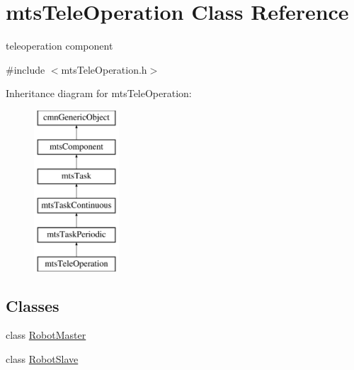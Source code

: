 \hypertarget{classmts_tele_operation}{}\section{mts\+Tele\+Operation Class Reference}
\label{classmts_tele_operation}


teleoperation component  




{\ttfamily \#include $<$mts\+Tele\+Operation.\+h$>$}

Inheritance diagram for mts\+Tele\+Operation\+:\begin{figure}[H]
\begin{center}
\leavevmode
\includegraphics[height=6.000000cm]{d0/d58/classmts_tele_operation}
\end{center}
\end{figure}
\subsection*{Classes}
\begin{DoxyCompactItemize}
\item 
class \hyperlink{classmts_tele_operation_1_1_robot_master}{Robot\+Master}
\item 
class \hyperlink{classmts_tele_operation_1_1_robot_slave}{Robot\+Slave}
\end{DoxyCompactItemize}

